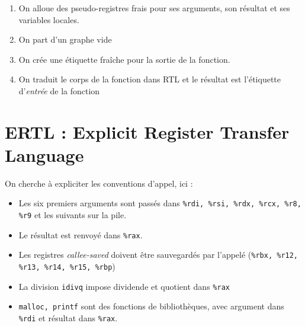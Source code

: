 \documentclass{cours}
\begin{document}
\begin{itemize}
          \begin{enumerate}
              \item On alloue des pseudo-registres frais pour ses arguments, son résultat et ses variables locales.
              \item On part d'un graphe vide
              \item On crée une étiquette fraîche pour la sortie de la fonction.
              \item On traduit le corps de la fonction dans RTL et le résultat est l'étiquette d'\emph{entrée} de la fonction
          \end{enumerate}
\end{itemize}

\section{ERTL : Explicit Register Transfer Language}
On cherche à expliciter les conventions d'appel, ici :
\begin{itemize}
    \item Les six premiers arguments sont passés dans \texttt{\%rdi, \%rsi, \%rdx, \%rcx, \%r8, \%r9} et les suivants sur la pile.
    \item Le résultat est renvoyé dans \texttt{\%rax}.
    \item Les registres \emph{callee-saved} doivent être sauvegardés par l'appelé (\texttt{\%rbx, \%r12, \%r13, \%r14, \%r15, \%rbp})
    \item La division \texttt{idivq} impose dividende et quotient dans \texttt{\%rax}
    \item \texttt{malloc, printf} sont des fonctions de bibliothèques, avec argument dans \texttt{\%rdi} et résultat dans \texttt{\%rax}.
\end{itemize}
\end{document}

